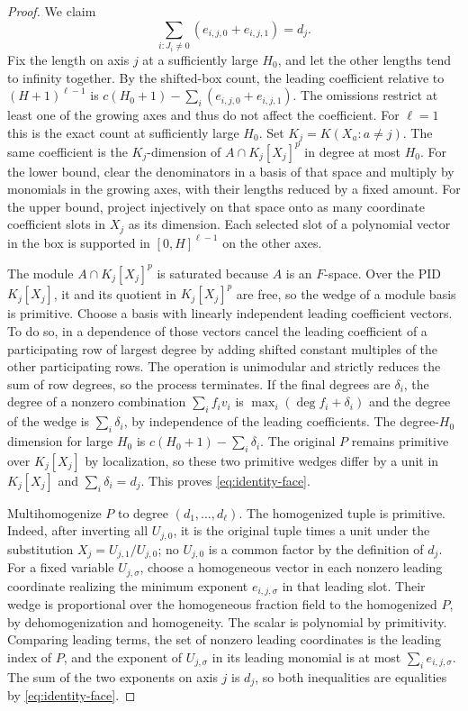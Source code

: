 \documentclass[11pt,a4paper,reqno]{amsart}
\theoremstyle{definition}
\theoremstyle{remark}
\numberwithin{equation}{section}
\begin{document}
\begin{proof}
We claim
\begin{equation}\label{eq:identity-face}
      \sum_{i:J_i\ne0}(e_{i,j,0}+e_{i,j,1})=d_j .
\end{equation}
Fix the length on axis \(j\) at a sufficiently large \(H_0\),
and let the other lengths tend to infinity together. By the
shifted-box count, the leading coefficient relative to
\((H+1)^{\ell-1}\) is
\(c(H_0+1)-\sum_i(e_{i,j,0}+e_{i,j,1})\).
The omissions restrict at least one of the growing axes and
thus do not affect the coefficient. For \(\ell=1\) this is
the exact count at sufficiently large \(H_0\).
Set \(K_j=K(X_a:a\ne j)\). The same coefficient is the
\(K_j\)-dimension of \(A\cap K_j[X_j]^p\) in degree at most
\(H_0\). For the lower bound, clear the denominators in a
basis of that space and multiply by monomials in the growing
axes, with their lengths reduced by a fixed amount. For the
upper bound, project injectively on that space onto as many
coordinate coefficient slots in \(X_j\) as its dimension.
Each selected slot of a polynomial vector in the box is
supported in \([0,H]^{\ell-1}\) on the other axes.

The module \(A\cap K_j[X_j]^p\) is saturated because \(A\)
is an \(F\)-space. Over the PID \(K_j[X_j]\), it and its
quotient in \(K_j[X_j]^p\) are free, so the wedge of a
module basis is primitive. Choose a basis with linearly
independent leading coefficient vectors. To do so, in a
dependence of those vectors cancel the leading coefficient
of a participating row of largest degree by adding shifted
constant multiples of the other participating rows. The
operation is unimodular and strictly reduces the sum of row
degrees, so the process terminates. If the final degrees
are \(\delta_i\), the degree of a nonzero combination
\(\sum_i f_i v_i\) is \(\max_i(\deg f_i+\delta_i)\) and the
degree of the wedge is \(\sum_i\delta_i\), by independence
of the leading coefficients. The degree-\(H_0\) dimension
for large \(H_0\) is \(c(H_0+1)-\sum_i\delta_i\).
The original \(P\) remains primitive over \(K_j[X_j]\) by
localization, so these two primitive wedges differ by a
unit in \(K_j[X_j]\) and \(\sum_i\delta_i=d_j\). This proves
\eqref{eq:identity-face}.

Multihomogenize \(P\) to degree \((d_1,\ldots,d_\ell)\).
The homogenized tuple is primitive. Indeed, after inverting
all \(U_{j,0}\), it is the original tuple times a unit
under the substitution \(X_j=U_{j,1}/U_{j,0}\); no \(U_{j,0}\)
is a common factor by the definition of \(d_j\).
For a fixed variable \(U_{j,\sigma}\), choose a homogeneous
vector in each nonzero leading coordinate realizing the
minimum exponent \(e_{i,j,\sigma}\) in that leading slot.
Their wedge is proportional over the homogeneous fraction
field to the homogenized \(P\), by dehomogenization and
homogeneity. The scalar is polynomial by primitivity.
Comparing leading terms, the set of nonzero leading coordinates
is the leading index of \(P\), and the exponent of
\(U_{j,\sigma}\) in its leading monomial is at most
\(\sum_i e_{i,j,\sigma}\). The sum of the two exponents on
axis \(j\) is \(d_j\), so both inequalities are equalities
by \eqref{eq:identity-face}.


\end{proof}
\end{document}
